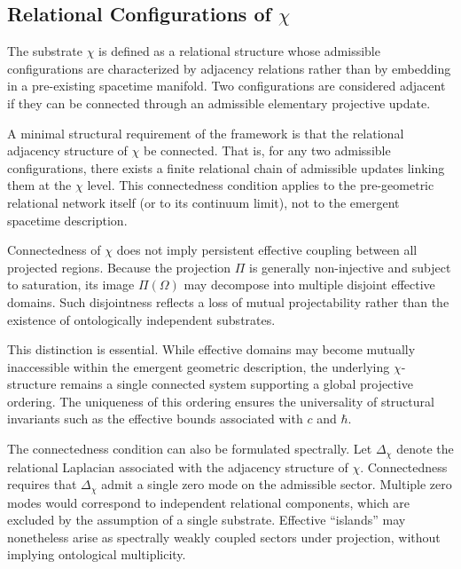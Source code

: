 \subsection{Relational Configurations of $\chi$}
  \label{subsec:relational-configurations}

  The substrate $\chi$ is defined as a relational structure whose admissible
  configurations are characterized by adjacency relations rather than by
  embedding in a pre-existing spacetime manifold.
  Two configurations are considered adjacent if they can be connected
  through an admissible elementary projective update.

  A minimal structural requirement of the framework is that the relational
  adjacency structure of $\chi$ be connected.
  That is, for any two admissible configurations, there exists a finite
  relational chain of admissible updates linking them at the $\chi$ level.
  This connectedness condition applies to the pre-geometric relational
  network itself (or to its continuum limit), not to the emergent spacetime
  description.

  Connectedness of $\chi$ does not imply persistent effective coupling
  between all projected regions.
  Because the projection $\Pi$ is generally non-injective and subject
  to saturation, its image $\Pi(\Omega)$ may decompose into multiple
  disjoint effective domains.
  Such disjointness reflects a loss of mutual projectability rather
  than the existence of ontologically independent substrates.

  This distinction is essential.
  While effective domains may become mutually inaccessible within the
  emergent geometric description, the underlying $\chi$-structure remains
  a single connected system supporting a global projective ordering.
  The uniqueness of this ordering ensures the universality of structural
  invariants such as the effective bounds associated with $c$ and $\hbar$.

  The connectedness condition can also be formulated spectrally.
  Let $\Delta_\chi$ denote the relational Laplacian associated with the
  adjacency structure of $\chi$.
  Connectedness requires that $\Delta_\chi$ admit a single zero mode on
  the admissible sector.
  Multiple zero modes would correspond to independent relational components,
  which are excluded by the assumption of a single substrate.
  Effective ``islands'' may nonetheless arise as spectrally weakly coupled
  sectors under projection, without implying ontological multiplicity.
